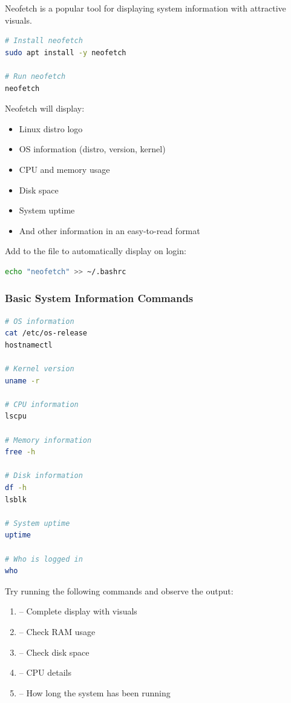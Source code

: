 Neofetch is a popular tool for displaying system information with attractive visuals.

\begin{lstlisting}[language=bash, caption={Install neofetch}]
# Install neofetch
sudo apt install -y neofetch

# Run neofetch
neofetch
\end{lstlisting}

Neofetch will display:
\begin{itemize}
    \item Linux distro logo
    \item OS information (distro, version, kernel)
    \item CPU and memory usage
    \item Disk space
    \item System uptime
    \item And other information in an easy-to-read format
\end{itemize}

\begin{tipbox}
Add  to the  file to automatically display on login:
\begin{lstlisting}[language=bash]
echo "neofetch" >> ~/.bashrc
\end{lstlisting}
\end{tipbox}

\subsubsection{Basic System Information Commands}

\begin{lstlisting}[language=bash, caption={Basic system information commands}]
# OS information
cat /etc/os-release
hostnamectl

# Kernel version
uname -r

# CPU information
lscpu

# Memory information
free -h

# Disk information
df -h
lsblk

# System uptime
uptime

# Who is logged in
who
\end{lstlisting}

\begin{examplebox}
Try running the following commands and observe the output:
\begin{enumerate}
    \item {} -- Complete display with visuals
    \item {} -- Check RAM usage
    \item {} -- Check disk space
    \item {} -- CPU details
    \item {} -- How long the system has been running
\end{enumerate}
\end{examplebox}

